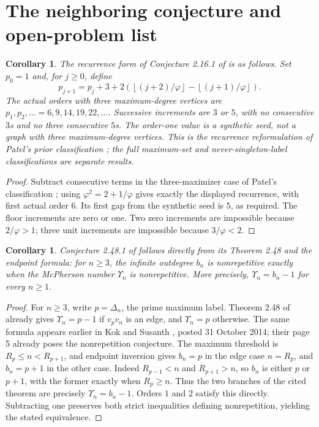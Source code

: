 \documentclass[11pt]{article}
\newtheorem{corollary}[theorem]{Corollary}
\newcommand{\fl}[1]{\left\lfloor #1\right\rfloor}
\newcommand{\ph}{\varphi}
\begin{document}
\section{The neighboring conjecture and open-problem list}
\begin{corollary}\label{tripleorders}
The recurrence form of Conjecture 2.16.1 of \cite[p.~73]{critical}
is as follows. Set $p_0=1$ and, for $j\ge0$, define
\[
 p_{j+1}=p_j+3+2\left(\fl{(j+2)/\ph}-\fl{(j+1)/\ph}\right).
\]
The actual orders with three maximum-degree vertices are
$p_1,p_2,\ldots=6,9,14,19,22,\ldots$.
Successive increments are $3$ or $5$, with no consecutive $3$s
and no three consecutive $5$s. The order-one value is a synthetic
seed, not a graph with three maximum-degree vertices.
This is the recurrence reformulation of Patel's prior classification
\cite{patelsets}; the full maximum-set and never-singleton-label
classifications \cite{patelsets,patelnever} are separate results.
\end{corollary}
\begin{proof}
Subtract consecutive terms in the three-maximizer case of Patel's
classification \cite{patelsets}; using $\ph^2=2+1/\ph$ gives
exactly the displayed recurrence, with first actual order $6$.
Its first gap from the synthetic seed is $5$, as required.
The floor increments are zero or one.
Two zero increments are impossible because $2/\ph>1$;
three unit increments are impossible because $3/\ph<2$.
\end{proof}

\begin{corollary}\label{mcpherson}
Conjecture 2.48.1 of \cite[p.~91]{critical} follows directly from
its Theorem 2.48 and the endpoint formula: for $n\ge3$,
the infinite outdegree $b_n$ is nonrepetitive exactly when the
McPherson number $\Upsilon_n$ is nonrepetitive. More precisely,
$\Upsilon_n=b_n-1$ for every $n\ge1$.
\end{corollary}
\begin{proof}
For $n\ge3$, write $p=\Delta_n$, the prime maximum label.
Theorem 2.48 of \cite{critical} already gives $\Upsilon_n=p-1$
if $v_pv_n$ is an edge, and $\Upsilon_n=p$ otherwise.
The same formula appears earlier in Kok and Susanth
\cite[Theorem 2.3, p.~4]{mcphersonprior}, posted 31 October 2014;
their page 5 already poses the nonrepetition conjecture.
The maximum threshold is $R_p\le n<R_{p+1}$, and endpoint inversion
gives $b_n=p$ in the edge case $n=R_p$, and $b_n=p+1$ in the
other case. Indeed $R_{p-1}<n$ and $R_{p+1}>n$, so $b_n$ is
either $p$ or $p+1$, with the former exactly when $R_p\ge n$.
Thus the two branches of the cited theorem are precisely
$\Upsilon_n=b_n-1$. Orders $1$ and $2$ satisfy this directly.
Subtracting one preserves both strict inequalities defining
nonrepetition, yielding the stated equivalence.
\end{proof}
\end{document}
